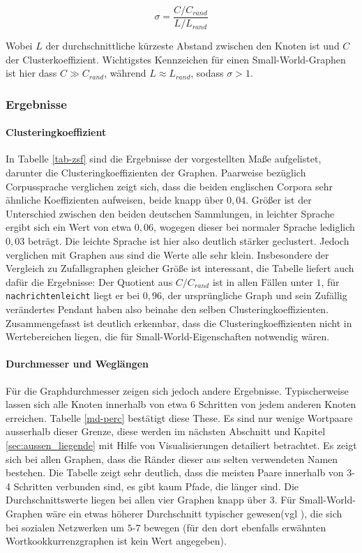 \documentclass[11pt, a4paper]{article}
\begin{document}
$$
\sigma = \frac{C/C_{rand}}{ L/L_{rand}}
$$

Wobei $L$ der durchschnittliche kürzeste Abstand zwischen den Knoten ist und $C$
der Clusterkoeffizient. Wichtigstes Kennzeichen für einen Small-World-Graphen
ist hier dass $C \gg C_{rand}$, während $L \approx L_{rand}$, sodass $\sigma > 1$.\\


\subsubsection{Ergebnisse}
\paragraph{Clusteringkoeffizient}
In Tabelle \ref{tab-zsf} sind die Ergebnisse der vorgestellten Maße aufgelistet, darunter die Clusteringkoeffizienten der Graphen. Paarweise bezüglich Corpussprache verglichen zeigt sich, dass die beiden englischen Corpora sehr ähnliche Koeffizienten aufweisen, beide knapp über $0,04$. Größer ist der Unterschied zwischen den beiden deutschen Sammlungen, in leichter Sprache ergibt sich ein Wert von etwa $0,06$, wogegen dieser bei normaler Sprache lediglich $0,03$ beträgt. Die leichte Sprache ist hier also deutlich stärker geclustert. Jedoch verglichen mit Graphen aus \cite[S. 182]{Newman2003} sind die Werte alle sehr klein. Insbesondere der Vergleich zu Zufallsgraphen gleicher Größe ist interessant, die Tabelle liefert auch dafür die Ergebnisse: Der Quotient aus $C/C_{rand}$ ist in allen Fällen unter $1$, für \texttt{nachrichtenleicht} liegt er bei $0,96$, der ursprüngliche Graph und sein Zufällig verändertes Pendant haben also beinahe den selben Clusteringkoeffizienten. Zusammengefasst ist deutlich erkennbar, dass die Clusteringkoeffizienten nicht in Wertebereichen liegen, die für Small-World-Eigenschaften notwendig wären.

\paragraph{Durchmesser und Weglängen}
Für die Graphdurchmesser zeigen sich jedoch andere Ergebnisse. Typischerweise lassen sich alle Knoten innerhalb von etwa 6 Schritten von jedem anderen Knoten erreichen. Tabelle \ref{md-perc} bestätigt diese These. Es sind nur wenige Wortpaare ausserhalb dieser Grenze, diese werden im nächsten Abschnitt und Kapitel \ref{sec:aussen_liegende} mit Hilfe von Visualisierungen detailiert betrachtet. Es zeigt sich bei allen Graphen, dass die Ränder dieser aus selten verwendeten Namen bestehen.
Die Tabelle zeigt sehr deutlich, dass die meisten Paare innerhalb von 3-4 Schritten verbunden sind, es gibt kaum Pfade, die länger sind. Die Durchschnittswerte liegen bei allen vier Graphen knapp über 3. Für Small-World-Graphen wäre ein etwas höherer Durchschnitt typischer gewesen(vgl \cite{Newman2003}), die sich bei sozialen Netzwerken um $5$-$7$ bewegen (für den dort ebenfalls erwähnten Wortkookkurrenzgraphen ist kein Wert angegeben).   
\end{document}
